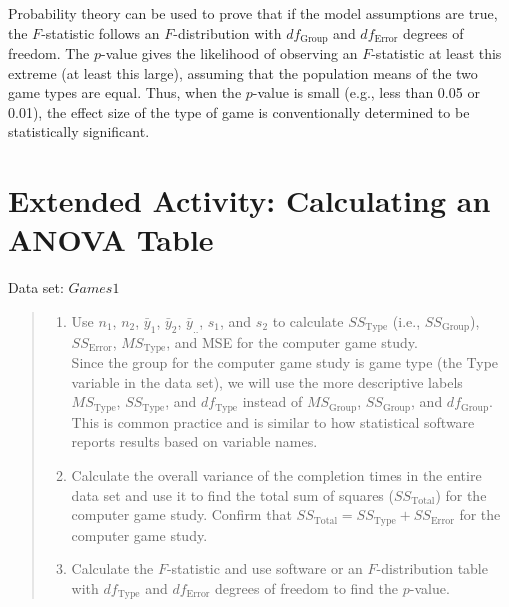 \documentclass[
]{report}
\providecommand{\tightlist}{%
  \setlength{\itemsep}{0pt}\setlength{\parskip}{0pt}}
\begin{document}
Probability theory can be used to prove that if the model assumptions are true, the \(F\)-statistic follows an \(F\)-distribution with \(df_{\text{Group}}\) and \(df_{\text{Error}}\) degrees of freedom. The \(p\)-value gives the likelihood of observing an \(F\)-statistic at least this extreme (at least this large), assuming that the population means of the two game types are equal. Thus, when the \(p\)-value is small (e.g., less than 0.05 or 0.01), the effect size of the type of game is conventionally determined to be statistically significant.

\section*{Extended Activity: Calculating an ANOVA Table}\label{extended-activity-calculating-an-anova-table}

Data set: \(Games1\)

\begin{quote}
\begin{enumerate}
\def\labelenumi{\arabic{enumi}.}
\setcounter{enumi}{36}
\tightlist
\item
  Use \(n_1\), \(n_2\), \(\bar{y}_1\), \(\bar{y}_2\), \(\bar{y}_{..}\), \(s_1\), and \(s_2\) to calculate \(SS_{\text{Type}}\) (i.e., \(SS_{\text{Group}}\)), \(SS_{\text{Error}}\), \(MS_{\text{Type}}\), and MSE for the computer game study.\\
  Since the group for the computer game study is game type (the Type variable in the data set), we will use the more descriptive labels \(MS_{\text{Type}}\), \(SS_{\text{Type}}\), and \(df_{\text{Type}}\) instead of \(MS_{\text{Group}}\), \(SS_{\text{Group}}\), and \(df_{\text{Group}}\). This is common practice and is similar to how statistical software reports results based on variable names.
\item
  Calculate the overall variance of the completion times in the entire data set and use it to find the total sum of squares (\(SS_{\text{Total}}\)) for the computer game study. Confirm that \(SS_{\text{Total}} = SS_{\text{Type}} + SS_{\text{Error}}\) for the computer game study.
\item
  Calculate the \(F\)-statistic and use software or an \(F\)-distribution table with \(df_{\text{Type}}\) and \(df_{\text{Error}}\) degrees of freedom to find the \(p\)-value.
\end{enumerate}
\end{quote}
\end{document}
